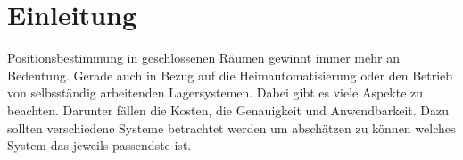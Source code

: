 \chapter{Einleitung}
Positionsbestimmung in geschlossenen Räumen gewinnt immer mehr an Bedeutung.
Gerade auch in Bezug auf die Heimautomatisierung oder den Betrieb von
selbsständig arbeitenden Lagersystemen. Dabei gibt es viele Aspekte zu
beachten. Darunter fällen die Kosten, die Genauigkeit und Anwendbarkeit.
Dazu sollten verschiedene Systeme betrachtet werden um abschätzen zu können
welches System das jeweils passendste ist.

\cleardoublepage
